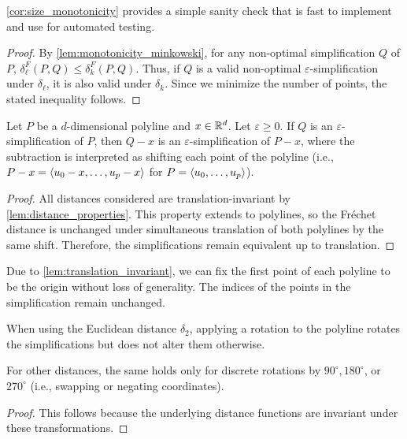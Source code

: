 \cref{cor:size_monotonicity} provides a simple sanity check that is fast to implement and use for automated testing.

\begin{proof}
	By \cref{lem:monotonicity_minkowski}, for any non-optimal simplification \(Q\) of \(P\), \(\delta_\ell^F(P, Q) \leq \delta_k^F(P, Q)\). Thus, if \(Q\) is a valid non-optimal \(\varepsilon\)-simplification under \(\delta_\ell\), it is also valid under \(\delta_k\). Since we minimize the number of points, the stated inequality follows.
\end{proof}

\begin{lemma}\label{lem:translation_invariant}
	Let \(P\) be a \(d\)-dimensional polyline and \(x \in \mathbb{R}^d\). Let \(\varepsilon \geq 0\). If \(Q\) is an \(\varepsilon\)-simplification of \(P\), then \(Q-x\) is an \(\varepsilon\)-simplification of \(P-x\), where the subtraction is interpreted as shifting each point of the polyline (i.e., \(P-x = \left\langle u_0 - x, \dots, u_p - x\right\rangle\) for \(P = \left\langle u_0,\dots, u_p\right\rangle\)).
\end{lemma}

\begin{proof}
	All distances considered are translation-invariant by \cref{lem:distance_properties}. This property extends to polylines, so the Fréchet distance is unchanged under simultaneous translation of both polylines by the same shift. Therefore, the simplifications remain equivalent up to translation.
\end{proof}

Due to \cref{lem:translation_invariant}, we can fix the first point of each polyline to be the origin without loss of generality. The indices of the points in the simplification remain unchanged.

\begin{corollary}\label{cor:rot_inv}
  When using the Euclidean distance \(\delta_2\), applying a rotation to the polyline rotates the simplifications but does not alter them otherwise.

	For other distances, the same holds only for discrete rotations by \(90^\circ, 180^\circ\), or \(270^\circ\) (i.e., swapping or negating coordinates).
\end{corollary}

\begin{proof}
	This follows because the underlying distance functions are invariant under these transformations.
\end{proof}


